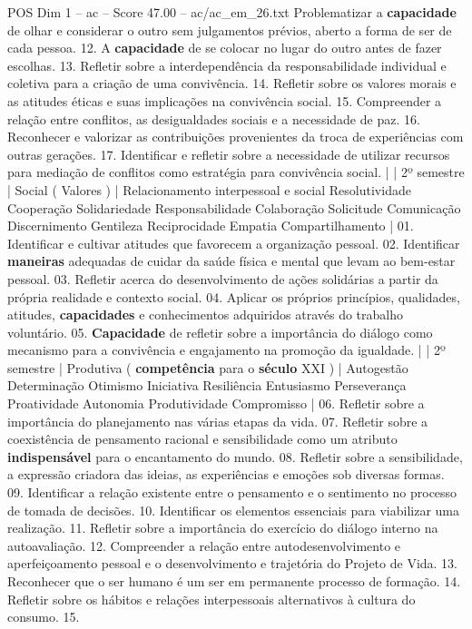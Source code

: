 \begin{textsample}{POS Dim 1 – ac – Score 47.00 – ac/ac\_em\_26.txt}
Problematizar a \textbf{capacidade} de olhar e considerar o outro sem julgamentos prévios, aberto a forma de ser de cada pessoa. 12.
A \textbf{capacidade} de se colocar no lugar do outro antes de fazer escolhas. 13.
Refletir sobre a interdependência da responsabilidade individual e coletiva para a criação de uma convivência. 14.
Refletir sobre os valores morais e as atitudes éticas e suas implicações na convivência social. 15.
Compreender a relação entre conflitos, as desigualdades sociais e a necessidade de paz. 16.
Reconhecer e valorizar as contribuições provenientes da troca de experiências com outras gerações. 17.
Identificar e refletir sobre a necessidade de utilizar recursos para mediação de conflitos como estratégia para convivência social. | | 2º semestre | Social ( Valores ) | Relacionamento interpessoal e social Resolutividade Cooperação Solidariedade Responsabilidade Colaboração Solicitude Comunicação Discernimento Gentileza Reciprocidade Empatia Compartilhamento | 01.
Identificar e cultivar atitudes que favorecem a organização pessoal. 02.
Identificar \textbf{maneiras} adequadas de cuidar da saúde física e mental que levam ao bem-estar pessoal. 03.
Refletir acerca do desenvolvimento de ações solidárias a partir da própria realidade e contexto social. 04.
Aplicar os próprios princípios, qualidades, atitudes, \textbf{capacidades} e conhecimentos adquiridos através do trabalho voluntário. 05. \textbf{Capacidade} de refletir sobre a importância do diálogo como mecanismo para a convivência e engajamento na promoção da igualdade. | | 2º semestre | Produtiva ( \textbf{competência} para o \textbf{século} XXI ) | Autogestão Determinação Otimismo Iniciativa Resiliência Entusiasmo Perseverança Proatividade Autonomia Produtividade Compromisso | 06.
Refletir sobre a importância do planejamento nas várias etapas da vida. 07.
Refletir sobre a coexistência de pensamento racional e sensibilidade como um atributo \textbf{indispensável} para o encantamento do mundo. 08.
Refletir sobre a sensibilidade, a expressão criadora das ideias, as experiências e emoções sob diversas formas. 09.
Identificar a relação existente entre o pensamento e o sentimento no processo de tomada de decisões. 10.
Identificar os elementos essenciais para viabilizar uma realização. 11.
Refletir sobre a importância do exercício do diálogo interno na autoavaliação. 12.
Compreender a relação entre autodesenvolvimento e aperfeiçoamento pessoal e o desenvolvimento e trajetória do Projeto de Vida. 13.
Reconhecer que o ser humano é um ser em permanente processo de formação. 14.
Refletir sobre os hábitos e relações interpessoais alternativos à cultura do consumo. 15.

\end{textsample}
